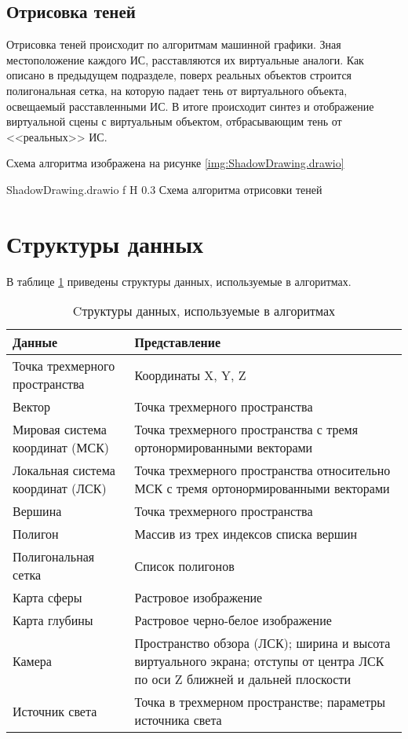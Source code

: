 \subsection{Отрисовка теней}

Отрисовка теней происходит по алгоритмам машинной графики. Зная местоположение каждого ИС, расставляются их виртуальные аналоги. Как описано в предыдущем подразделе, поверх реальных объектов строится полигональная сетка, на которую падает тень от виртуального объекта, освещаемый расставленными ИС. В итоге происходит синтез и отображение виртуальной сцены с виртуальным объектом, отбрасывающим тень от <<реальных>> ИС.

Схема алгоритма изображена на рисунке \ref{img:ShadowDrawing.drawio}

{ShadowDrawing.drawio}
{f}
{H}
{0.3\textwidth}
{Схема алгоритма отрисовки теней}

\section{Структуры данных}

В таблице \ref{DataStructures} приведены структуры данных, используемые в алгоритмах.

\begin{table}[H]
	\caption{Cтруктуры данных, используемые в алгоритмах}
	\label{DataStructures}
	\begin{center}
		\begin{tabular}{| p{4 cm} | p{11 cm} |} 
			\hline
			Данные & Представление \\
			\hline
			Точка трехмерного пространства & Координаты X, Y, Z \\
			\hline
			Вектор & Точка трехмерного пространства  \\
			\hline
			Мировая система координат (МСК) & Точка трехмерного пространства с тремя ортонормированными векторами \\
			\hline
			Локальная система координат (ЛСК) & Точка трехмерного пространства относительно МСК с тремя ортонормированными векторами \\
			\hline
			Вершина & Точка трехмерного пространства \\
			\hline
			Полигон & Массив из трех индексов списка вершин \\
			\hline
			Полигональная сетка & Список полигонов \\
			\hline
			Карта сферы & Растровое изображение \\
			\hline
			Карта глубины & Растровое черно-белое изображение \\
			\hline
			Камера & Пространство обзора (ЛСК); ширина и высота виртуального экрана; отступы от центра ЛСК по оси Z ближней и дальней плоскости \\
			\hline
			Источник света & Точка в трехмерном пространстве; параметры источника света \\
			\hline
		\end{tabular}
	\end{center}
\end{table}

